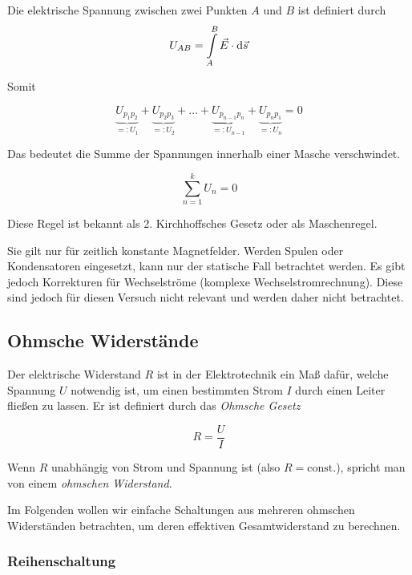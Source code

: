 \documentclass[a4paper,german,12pt,smallheadings]{scrartcl}
\begin{document}
Die elektrische Spannung zwischen zwei Punkten $A$ und $B$ ist definiert durch
\begin{equation}
  U_{AB} = \int\limits_A^B \vec{E} \cdot \dif \vec{s}
\end{equation}

Somit

\begin{equation}
  \underbrace{U_{p_1p_2}}_{=: U_1} +
  \underbrace{U_{p_2p_3}}_{=: U_2} +
  \dots +
  \underbrace{U_{p_{n-1}p_n}}_{=: U_{n-1}} +
  \underbrace{U_{p_np_1}}_{=: U_n} = 0
\end{equation}

Das bedeutet die Summe der Spannungen innerhalb einer Masche verschwindet.

\begin{equation}
  \sum_{n=1}^k U_n = 0
\end{equation}

Diese Regel ist bekannt als 2. Kirchhoffsches Gesetz oder als Maschenregel.

Sie gilt nur für zeitlich konstante Magnetfelder. Werden Spulen oder
Kondensatoren eingesetzt, kann nur der statische Fall betrachtet werden. Es
gibt jedoch Korrekturen für Wechselströme (komplexe Wechselstromrechnung).
Diese sind jedoch für diesen Versuch nicht relevant und werden daher nicht
betrachtet.

\subsection{Ohmsche Widerstände}

Der elektrische Widerstand $R$ ist in der Elektrotechnik ein Maß dafür, welche
Spannung $U$ notwendig ist, um einen bestimmten Strom $I$ durch einen Leiter
fließen zu lassen. Er ist definiert durch das \textit{Ohmsche Gesetz}

\begin{equation}
  R = \frac{U}{I}
\end{equation}

Wenn $R$ unabhängig von Strom und Spannung ist (also $R = \text{const.}$),
spricht man von einem \textit{ohmschen Widerstand}.

Im Folgenden wollen wir einfache Schaltungen aus mehreren ohmschen Widerständen
betrachten, um deren effektiven Gesamtwiderstand zu berechnen.

\subsubsection{Reihenschaltung}
\end{document}
